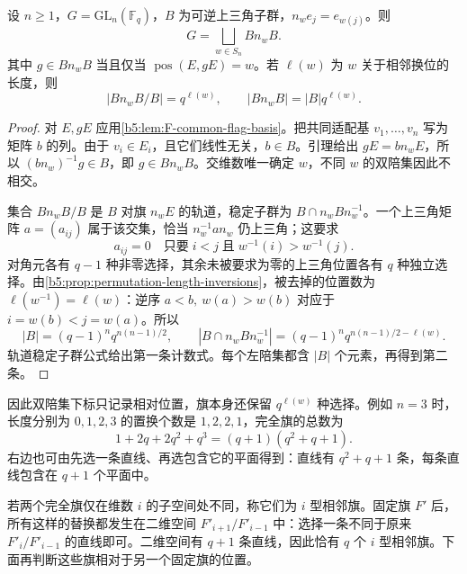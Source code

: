 \begin{theorem}\label{b5:thm:F-GL-Bruhat}
	设 \(n\ge1\)，\(G=\mathrm{GL}_n(\mathbb F_q)\)，\(B\) 为可逆上三角子群，\(n_w e_j=e_{w(j)}\)。则
	\[
		G=\bigsqcup_{w\in S_n}Bn_wB.
	\]
	其中 \(g\in Bn_wB\) 当且仅当 \(\operatorname{pos}(E,gE)=w\)。若 \(\ell(w)\) 为 \(w\) 关于相邻换位的长度，则
	\begin{equation}\label{b5:eq:F-Bruhat-cell-size}
		|Bn_wB/B|=q^{\ell(w)},\qquad
		|Bn_wB|=|B|q^{\ell(w)}.
	\end{equation}
\end{theorem}
\begin{proof}
	对 \(E,gE\) 应用\cref{b5:lem:F-common-flag-basis}。把共同适配基 \(v_1,\ldots,v_n\) 写为矩阵 \(b\) 的列。由于 \(v_i\in E_i\)，且它们线性无关，\(b\in B\)。引理给出 \(gE=bn_wE\)，所以 \((bn_w)^{-1}g\in B\)，即 \(g\in Bn_wB\)。交维数唯一确定 \(w\)，不同 \(w\) 的双陪集因此不相交。

	集合 \(Bn_wB/B\) 是 \(B\) 对旗 \(n_wE\) 的轨道，稳定子群为 \(B\cap n_wBn_w^{-1}\)。一个上三角矩阵 \(a=(a_{ij})\) 属于该交集，恰当 \(n_w^{-1}an_w\) 仍上三角；这要求
	\[
		a_{ij}=0\quad\text{只要}\;i<j\;\text{且}\;w^{-1}(i)>w^{-1}(j).
	\]
	对角元各有 \(q-1\) 种非零选择，其余未被要求为零的上三角位置各有 \(q\) 种独立选择。由\cref{b5:prop:permutation-length-inversions}，被去掉的位置数为 \(\ell(w^{-1})=\ell(w)\)：逆序 \(a<b,\ w(a)>w(b)\) 对应于 \(i=w(b)<j=w(a)\)。所以
	\[
		|B|=(q-1)^nq^{n(n-1)/2},\qquad
		|B\cap n_wBn_w^{-1}|=(q-1)^nq^{n(n-1)/2-\ell(w)}.
	\]
	轨道稳定子群公式给出第一条计数式。每个左陪集都含 \(|B|\) 个元素，再得到第二条。
\end{proof}

因此双陪集下标只记录相对位置，旗本身还保留 \(q^{\ell(w)}\) 种选择。例如 \(n=3\) 时，长度分别为 \(0,1,2,3\) 的置换个数是 \(1,2,2,1\)，完全旗的总数为
\[
	1+2q+2q^2+q^3=(q+1)(q^2+q+1).
\]
右边也可由先选一条直线、再选包含它的平面得到：直线有 \(q^2+q+1\) 条，每条直线包含在 \(q+1\) 个平面中。

\ProseParagraphBreak
若两个完全旗仅在维数 \(i\) 的子空间处不同，称它们为 \(i\) 型相邻旗。固定旗 \(F'\) 后，所有这样的替换都发生在二维空间 \(F'_{i+1}/F'_{i-1}\) 中：选择一条不同于原来 \(F'_i/F'_{i-1}\) 的直线即可。二维空间有 \(q+1\) 条直线，因此恰有 \(q\) 个 \(i\) 型相邻旗。下面再判断这些旗相对于另一个固定旗的位置。

